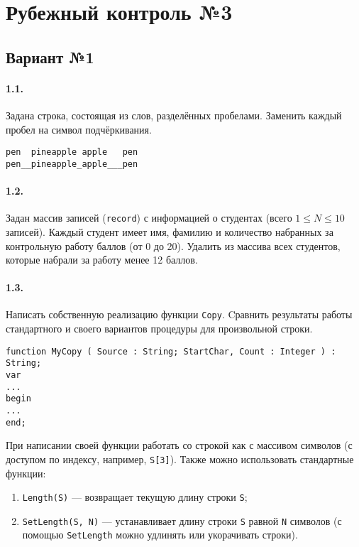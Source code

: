 \documentclass[12pt,a4paper]{report}
\begin{document}
\parindent=1cm
\pagestyle{empty}

\lstset{ language=Pascal, basicstyle=\small\ttfamily, numbers=left, numberstyle=\tiny, stepnumber=1, numbersep=5pt, extendedchars=\true, showstringspaces=false, breakatwhitespace=true, frame=single, keepspaces=true }

\clearpage
\section*{Рубежный контроль №3}
\subsection*{Вариант №1}
\paragraph*{1.1.}
Задана строка, состоящая из слов, разделённых пробелами. Заменить каждый пробел на символ подчёркивания.
\begin{verbatim}
pen  pineapple apple   pen
pen__pineapple_apple___pen
\end{verbatim}
\paragraph*{1.2.}
Задан массив записей (\texttt{record}) с информацией о студентах (всего $ 1 \le N \le 10 $ записей). Каждый студент имеет имя, фамилию и количество набранных за контрольную работу баллов (от 0 до 20).
Удалить из массива всех студентов, которые набрали за работу менее 12 баллов.
\paragraph*{1.3.}
Написать собственную реализацию функции \texttt{Copy}. Cравнить результаты работы стандартного и своего вариантов процедуры для произвольной строки.
\begin{verbatim}
function MyCopy ( Source : String; StartChar, Count : Integer ) : String;
var
...
begin
...
end;
\end{verbatim}
При написании своей функции работать со строкой как с массивом символов (с доступом по индексу, например, \texttt{S[3]}). Также можно использовать стандартные функции:
\begin{enumerate}
\item \texttt{Length(S)} --- возвращает текущую длину строки \texttt{S};
\item \texttt{SetLength(S, N)} --- устанавливает длину строки \texttt{S} равной \texttt{N} символов (с помощью \texttt{SetLength} можно удлинять или укорачивать строки).
\end{enumerate}
\end{document}
